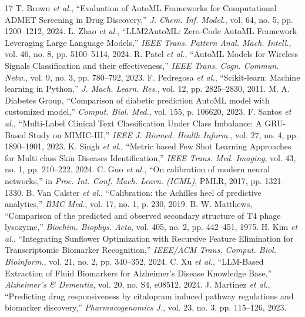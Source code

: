 \documentclass[conference]{IEEEtran}
\begin{document}
\begin{thebibliography}{17}
 T. Brown \textit{et al.}, ``Evaluation of AutoML Frameworks for Computational ADMET Screening in Drug Discovery,'' \textit{J. Chem. Inf. Model.}, vol. 64, no. 5, pp. 1200--1212, 2024.
 L. Zhao \textit{et al.}, ``LLM2AutoML: Zero-Code AutoML Framework Leveraging Large Language Models,'' \textit{IEEE Trans. Pattern Anal. Mach. Intell.}, vol. 46, no. 8, pp. 5100--5114, 2024.
 R. Patel \textit{et al.}, ``AutoML Models for Wireless Signals Classification and their effectiveness,'' \textit{IEEE Trans. Cogn. Commun. Netw.}, vol. 9, no. 3, pp. 780--792, 2023.
 F. Pedregosa \textit{et al.}, ``Scikit-learn: Machine learning in Python,'' \textit{J. Mach. Learn. Res.}, vol. 12, pp. 2825--2830, 2011.
 M. A. Diabetes Group, ``Comparison of diabetic prediction AutoML model with customized model,'' \textit{Comput. Biol. Med.}, vol. 155, p. 106620, 2023.
 F. Santos \textit{et al.}, ``Multi-Label Clinical Text Classification Under Class Imbalance: A GRU-Based Study on MIMIC-III,'' \textit{IEEE J. Biomed. Health Inform.}, vol. 27, no. 4, pp. 1890--1901, 2023.
 K. Singh \textit{et al.}, ``Metric based Few Shot Learning Approaches for Multi class Skin Diseases Identification,'' \textit{IEEE Trans. Med. Imaging}, vol. 43, no. 1, pp. 210--222, 2024.
 C. Guo \textit{et al.}, ``On calibration of modern neural networks,'' in \textit{Proc. Int. Conf. Mach. Learn. (ICML)}, PMLR, 2017, pp. 1321--1330.
 B. Van Calster \textit{et al.}, ``Calibration: the Achilles heel of predictive analytics,'' \textit{BMC Med.}, vol. 17, no. 1, p. 230, 2019.
 B. W. Matthews, ``Comparison of the predicted and observed secondary structure of T4 phage lysozyme,'' \textit{Biochim. Biophys. Acta}, vol. 405, no. 2, pp. 442--451, 1975.
 H. Kim \textit{et al.}, ``Integrating Sunflower Optimization with Recursive Feature Elimination for Transcriptomic Biomarker Recognition,'' \textit{IEEE/ACM Trans. Comput. Biol. Bioinform.}, vol. 21, no. 2, pp. 340--352, 2024.
 C. Xu \textit{et al.}, ``LLM-Based Extraction of Fluid Biomarkers for Alzheimer's Disease Knowledge Base,'' \textit{Alzheimer's \& Dementia}, vol. 20, no. S4, e08512, 2024.
 J. Martinez \textit{et al.}, ``Predicting drug responsiveness by citalopram induced pathway regulations and biomarker discovery,'' \textit{Pharmacogenomics J.}, vol. 23, no. 3, pp. 115--126, 2023.

\end{thebibliography}
\end{document}
